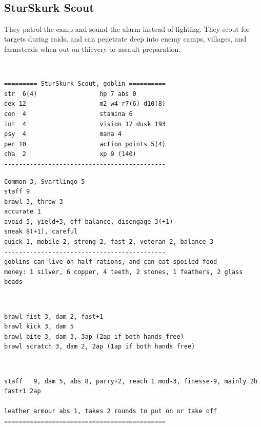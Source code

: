 \


\subsection*{SturSkurk Scout}

They patrol the camp and sound the alarm instead of fighting. They scout for targets during raids, and can penetrate deep into enemy camps, villages, and farmsteads when out on thievery or assault preparation.

\

\goodbreak \small \begin{samepage} \begin{verbatim}
========= SturSkurk Scout, goblin ==========
str  6(4)                 hp 7 abs 0
dex 12                    m2 w4 r7(6) d10(8)
con  4                    stamina 6
int  4                    vision 17 dusk 193
psy  4                    mana 4
per 10                    action points 5(4)
cha  2                    xp 9 (140)
--------------------------------------------
\end{verbatim} \end{samepage} \goodbreak \begin{samepage} \begin{verbatim}
Common 3, Svartlingo 5
staff 9
brawl 3, throw 3
accurate 1
avoid 5, yield+3, off balance, disengage 3(+1)
sneak 8(+1), careful
quick 1, mobile 2, strong 2, fast 2, veteran 2, balance 3
--------------------------------------------
goblins can live on half rations, and can eat spoiled food
money: 1 silver, 6 copper, 4 teeth, 2 stones, 1 feathers, 2 glass beads
\end{verbatim} \begin{samepage}   \   \goodbreak \end{samepage} \begin{verbatim}
brawl fist 3, dam 2, fast+1
brawl kick 3, dam 5 
brawl bite 3, dam 3, 3ap (2ap if both hands free)
brawl scratch 3, dam 2, 2ap (1ap if both hands free)
\end{verbatim} \begin{samepage}   \   \goodbreak \end{samepage} \begin{verbatim}
staff   9, dam 5, abs 8, parry+2, reach 1 mod-3, finesse-9, mainly 2h fast+1 2ap

leather armour abs 1, takes 2 rounds to put on or take off
============================================
\end{verbatim} \end{samepage} \normalsize

